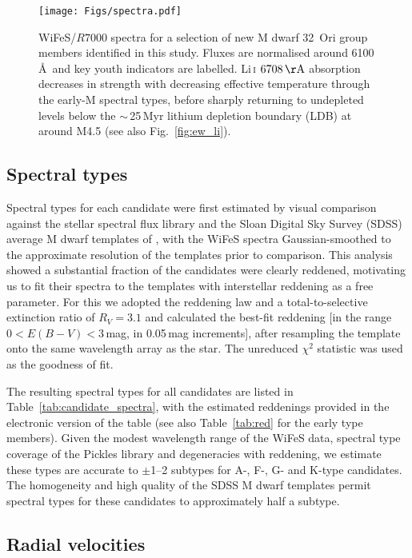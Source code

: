 \documentclass[usenatbib]{mnras}
\begin{document}
\begin{figure*}
\centering
\texttt{[image: Figs/spectra.pdf]}
\caption[]{WiFeS/$R7000$ spectra for a selection of new M dwarf 32~Ori
  group members identified in this study. Fluxes are normalised around
  6100\,\AA\ and key youth indicators are labelled. Li\,\textsc{i}
  $6708\,\rm{\AA}$ absorption decreases in strength with decreasing
  effective temperature through the early-M spectral types, before
  sharply returning to undepleted levels below the $\sim$\,25\,Myr
  lithium depletion boundary (LDB) at around M4.5 (see also
  Fig.~\ref{fig:ew_li}).}
\label{fig:spectra}
\end{figure*}

\subsection{Spectral types}
\label{spectral_types}

Spectral types for each candidate were first estimated by visual
comparison against the \citet{Pickles98} stellar spectral flux library
and the Sloan Digital Sky Survey (SDSS) average M dwarf templates of
\citet{Bochanski07}, with the WiFeS spectra Gaussian-smoothed to the
approximate resolution of the templates prior to comparison. This
analysis showed a substantial fraction of the candidates were clearly
reddened, motivating us to fit their spectra to the 
templates with interstellar reddening as a free parameter. For this
we adopted the \cite*{Cardelli89} reddening law and a total-to-selective
extinction ratio of $R_{V}=3.1$ and calculated
the best-fit reddening [in the range $0<E(B-V)<3$\,mag, in 0.05\,mag
  increments], after resampling the template onto the same wavelength
array as the star. The unreduced $\chi^{2}$ statistic was used as the
goodness of fit.

The resulting spectral types for all candidates are listed in
Table~\ref{tab:candidate_spectra}, with the estimated reddenings
provided in the electronic version of the table (see also
Table~\ref{tab:red} for the early type members). Given the modest
wavelength range of the WiFeS data, spectral type coverage of the
Pickles library and degeneracies with reddening, we estimate these
types are accurate to $\pm$1--2 subtypes for A-, F-, G- and K-type
candidates. The homogeneity and high quality of the SDSS M dwarf
templates permit spectral types for these candidates to approximately half a
subtype.

\subsection{Radial velocities}
\end{document}
